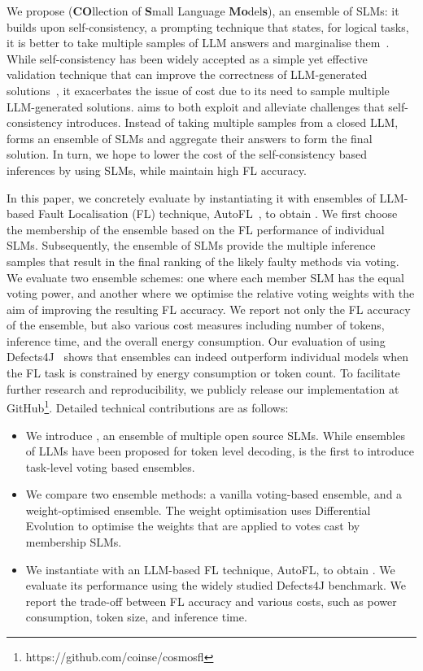 We propose \name (\textbf{CO}llection of \textbf{S}mall Language \textbf{Mo}del\textbf{s}), an ensemble of SLMs: it builds upon self-consistency, a prompting technique that states, for logical tasks, it is better to take multiple samples of LLM answers and marginalise them~\cite{wang2022self}. While self-consistency has been widely accepted as a simple yet effective validation technique that can improve the correctness of LLM-generated solutions~\cite{Kang2024aa,Ahmed2023aa,kangQuantitativeQualitativeEvaluation2024a}, it exacerbates the issue of cost due to its need to sample multiple LLM-generated solutions. \name aims to both exploit and alleviate challenges that self-consistency introduces. Instead of taking multiple samples from a closed LLM, \name forms an ensemble of SLMs and aggregate their answers to form the final solution. In turn, we hope to lower the cost of the self-consistency based inferences by using SLMs, while maintain high FL accuracy. 

In this paper, we concretely evaluate \name by instantiating it with ensembles of LLM-based Fault Localisation (FL) technique, AutoFL~\cite{kangQuantitativeQualitativeEvaluation2024a}, to obtain \cosmosfl. We first choose the membership of the ensemble based on the FL performance of individual SLMs. Subsequently, the ensemble of SLMs provide the multiple inference samples that result in the final ranking of the likely faulty methods via voting. We evaluate two ensemble schemes: one where each member SLM has the equal voting power, and another where we optimise the relative voting weights with the aim of improving the resulting FL accuracy. We report not only the FL accuracy of the ensemble, but also various cost measures including number of tokens, inference time, and the overall energy consumption. Our evaluation of \cosmosfl using Defects4J~\cite{just2014defects4j} shows that ensembles can indeed outperform individual models when the FL task is constrained by energy consumption or token count. To facilitate further research and reproducibility, we publicly release our implementation at GitHub\footnote{https://github.com/coinse/cosmosfl}. Detailed technical contributions are as follows:

\begin{itemize}
\item We introduce \name, an ensemble of multiple open source SLMs. While ensembles of LLMs have been proposed for token level decoding, \name is the first to introduce task-level voting based ensembles.

\item We compare two ensemble methods: a vanilla voting-based ensemble, and a weight-optimised ensemble. The weight optimisation uses Differential Evolution to optimise the weights that are applied to votes cast by membership SLMs.

\item We instantiate \name with an LLM-based FL technique, AutoFL, to obtain \cosmosfl. We evaluate its performance using the widely studied Defects4J benchmark. We report the trade-off between FL accuracy and various costs, such as power consumption, token size, and inference time.
\end{itemize}

